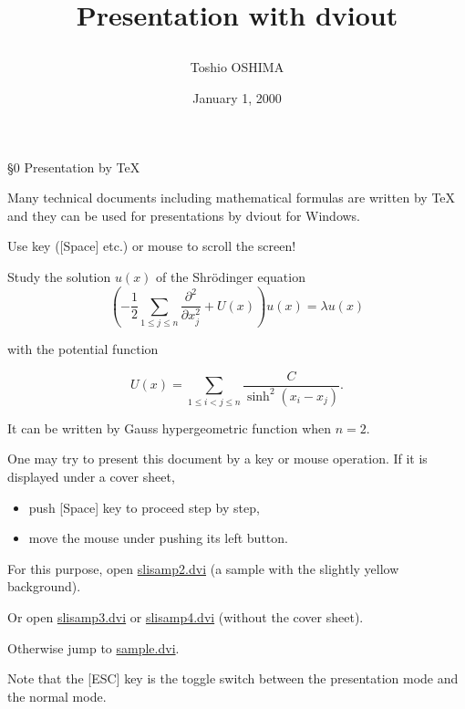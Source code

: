 \documentclass{slides}
\title{Presentation with dviout%
\special{dviout `keep cmode}%
\special{dviout -cmode=2 !ANFN0!p; -e=0 -y=XGAP !v;!bdf}%
\pagecolor{blue}%
}
\author{Toshio OSHIMA}
\date{January 1, 2000}
\def\pause{}
\begin{document}
\maketitle

\begin{slide}
\pagecolor{blue}%
{\large \S0 Presentation by \TeX}

Many technical documents including mathematical formulas are written by
{\TeX} and they can be used for presentations by dviout for Windows.

{\color{red} Use key ([Space] etc.) or mouse to scroll the screen!}

\pause
Study the solution $u(x)$ of the Shr\"odinger equation
\[
 \left(-\frac12\sum_{1\le j\le n}\frac{\partial^2}{\partial x_j^2} + U(x)\right)u(x) = \lambda u(x)
\]

with the potential function

\pause
\[
 U(x) = \sum_{1\le i < j\le n}\frac{C}{\sinh^2(x_i - x_j)}.
\]

\pause
It can be written by Gauss hypergeometric function when $n=2$.
\end{slide}
\begin{slide}
%
\pagecolor[rgb]{0,0.3,0}%
One may try to present this document by a key or mouse operation.
If it is displayed under a cover sheet,
\begin{itemize}
\item
push [Space] key to proceed step by step,
\item
move the mouse under pushing its left button.
\end{itemize}
For this purpose, open \href{file:slisamp2.dvi}{slisamp2.dvi} (a sample 
with the slightly yellow background).

Or open \href{file:slisamp3.dvi}{slisamp3.dvi} or \href{file:slisamp4.dvi}{slisamp4.dvi} (without the cover sheet).

Otherwise jump to \href{file:sample.dvi}{sample.dvi}. %

Note that the [ESC] key is the toggle switch between the presentation mode and
the normal mode.
\end{slide}
\end{document}
